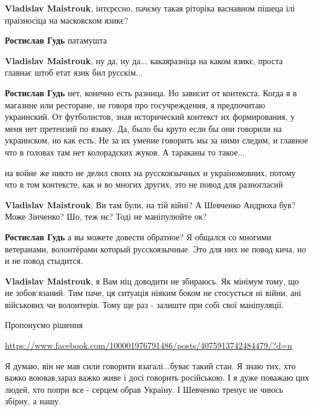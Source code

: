 \begin{itemize}
\begin{itemize}
\textbf{Vladislav Maistrouk}, інтєрєсно, пачєму такая ріторіка васнавном пішеца ілі праізносіца на масковском язикє?

\textbf{Ростислав Гудь} патамушта

\textbf{Vladislav Maistrouk}, ну да, ну да... какаяразніца на каком язикє, проста главнає штоб етат язик бил русскім...

\textbf{Ростислав Гудь} нет, конечно есть разница. Но зависит от контекста.
Когда я в магазине или ресторане, не говоря про госучреждения, я предпочитаю
украинский. От футболистов, зная исторический контекст их формирования, у меня
нет претензий по языку. Да, было бы круто если бы они говорили на украинском,
но как есть. Не за их умение говорить мы за ними следим, и главное что в
головах там нет колорадских жуков. А тараканы то такое...

на войне же никто не делил своих на русскоязычных и україномовних, потому что в
том контексте, как и во многих других, это не повод для разногласий

\textbf{Vladislav Maistrouk}, Ви там були, на тій війні? А Шевченко Андрюха
був? Може Зінченко? Шо, теж нє? Тоді не маніпулюйте ок?

\textbf{Ростислав Гудь} а вы можете довести обратное? Я общался со многими
ветеранами, волонтёрами который русскоязычные. Это для них не повод кича, но и
не повод стыдится.

\textbf{Vladislav Maistrouk}, я Вам ніц доводити не збираюсь. Як мінімум тому,
що не зобов‘язаний. Тим паче, ця ситуація ніяким боком не стосується ні війни,
ані військових чи волонтерів. Тому ще раз - залиште при собі свої маніпуляції.


\end{itemize}

Пропонуємо рішення\par 
\url{https://www.facebook.com/100001976791486/posts/4075913742484479/?d=n}


Я думаю, він не мав сили говорити взагалі...буває такий стан. Я знаю тих, хто
важко воював,зараз важко живе і досі говорить російською. І я дуже поважаю цих
людей, хто попри все - серцем обрав Україну. І Шевченко тренує не чиюсь збірну,
а нашу.

\begin{itemize}


\end{itemize}
\end{itemize}
